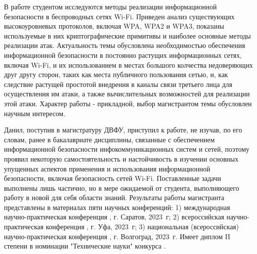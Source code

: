 \documentclass[ {{master thesis review}} ]{fefudoc}
\begin{document}
\Actuality
В работе студентом исследуются методы реализации информационной безопасности в беспроводных сетях Wi-Fi. Приведен анализ существующих высокоуровневых протоколов, включая WPA, WPA2 и WPA3, показаны используемые в них криптографические примитивы и наиболее основные методы реализации атак. Актуальность темы обусловлена необходимостью обеспечения информационной безопасности в постоянно растущих информационных сетях, включая Wi-Fi, и их использованием в местах большого колчества недоверяющих друг другу сторон, таких как места публичного пользования сетью, и, как следствие растущей простотой внедрения в каналы связи третьего лица для осуществления им атаки, а также вычислительных возможностей для реализации этой атаки. Характер работы - прикладной, выбор магистрантом темы обусловлен научным интересом.

\WorkingProcess
Данил, поступив в магистратуру ДВФУ, приступил к работе, не изучав, по его словам, ранее в бакалавриате дисциплины, связанные с обеспечением информационной безопасности инфокоммуникационных систем и сетей, поэтому проявил некоторую самостоятельность и настойчивость в изучении основных упущенных аспектов применения и использования информационной безопасности, включая безопасность сетей Wi-Fi. Поставленные задачи выполнены лишь частично, но в мере ожидаемой от студента, выполняющего работу в новой для себя области знаний. Результаты работы магистранта представлены в материалах пяти научных конференций:
1) международная научно-практическая конференция , г. Саратов, 2023~г;
2) всероссийская научно-практическая конференция , г. Уфа, 2023~г;
3) национальная (всероссийская) научно-практическая конференция , г. Волгоград, 2023~г. Имеет диплом II степени в номинации "Технические науки" конкурса .
\end{document}
